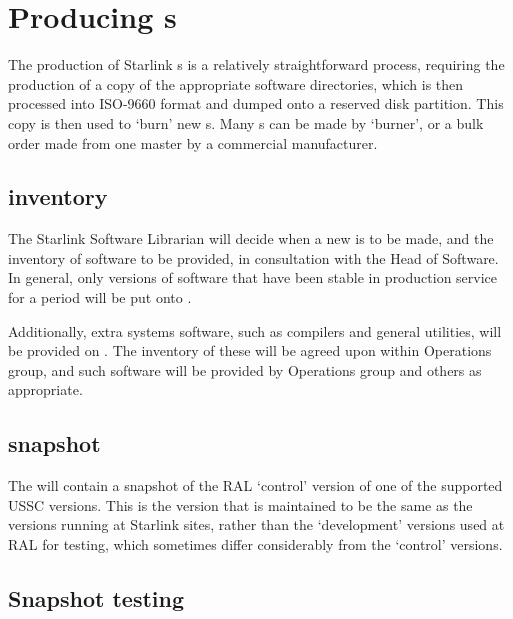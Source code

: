 \newpage
\section{\label{producing_cdroms}Producing {}s}

The production of Starlink {}s is a relatively straightforward
process, requiring the production of a copy of the appropriate
software directories, which is then processed into ISO-9660 format and
dumped onto a reserved disk partition.  This copy is then used to
`burn' new {}s.  Many {}s can be made by
{} `burner', or a bulk order made from one master by a
commercial manufacturer.

\subsection{\label{cdrom_inventory} inventory}

The Starlink Software Librarian will decide when a new {} is
to be made, and the inventory of software to be provided, in
consultation with the Head of Software.  In general, only versions of
software that have been stable in production service for a period will
be put onto {}.

Additionally, extra systems software, such as compilers and general
utilities, will be provided on {}.  The inventory of these will be
agreed upon within Operations group, and such software will  be
provided by Operations group and others as appropriate.

\subsection{\label{cdrom_snapshot} snapshot}

The {} will contain a snapshot of the RAL `control' version
of one of the supported USSC versions.  This is the version that is
maintained to be the same as the versions running at Starlink sites,
rather than the `development' versions used at RAL for testing,
which sometimes differ considerably from the `control' versions.

\subsection{\label{snapshot_testing}Snapshot testing}

